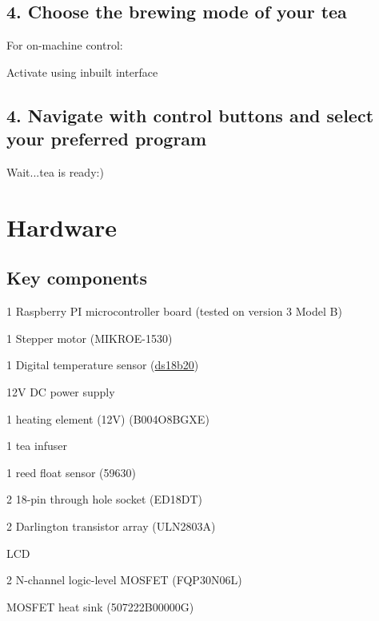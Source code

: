 \subsection*{4. Choose the brewing mode of your tea }

For on-\/machine control\+:


\begin{DoxyEnumerate}
\item Activate using inbuilt interface
\end{DoxyEnumerate}

\subsection*{4. Navigate with control buttons and select your preferred program }


\begin{DoxyEnumerate}
\item Wait...tea is ready\+:)
\end{DoxyEnumerate}

\section*{Hardware}

\subsection*{Key components}


\begin{DoxyItemize}
\item 1 Raspberry PI microcontroller board (tested on version 3 Model B)
\item 1 Stepper motor (M\+I\+K\+R\+O\+E-\/1530)
\item 1 Digital temperature sensor (\mbox{\hyperlink{classds18b20}{ds18b20}})
\item 12V DC power supply
\item 1 heating element (12V) (B004\+O8\+B\+G\+XE)
\item 1 tea infuser
\item 1 reed float sensor (59630)
\item 2 18-\/pin through hole socket (E\+D18\+DT)
\item 2 Darlington transistor array (U\+L\+N2803A)
\item L\+CD
\item 2 N-\/channel logic-\/level M\+O\+S\+F\+ET (F\+Q\+P30\+N06L)
\item M\+O\+S\+F\+ET heat sink (507222\+B00000G)
\end{DoxyItemize}

